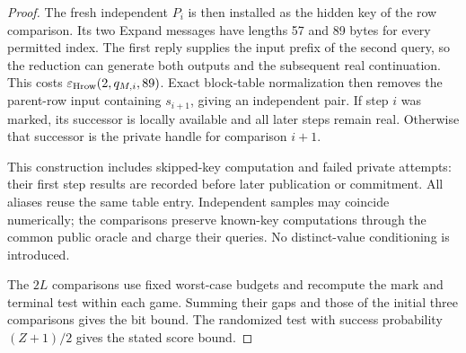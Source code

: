 \documentclass[pdflatex]{sn-jnl}
\theoremstyle{thmstyleone}
\theoremstyle{thmstylethree}
\theoremstyle{thmstyletwo}
\begin{document}
\begin{proof}
The fresh independent $P_i$ is then installed as the hidden key of
the row comparison. Its two Expand messages have lengths 57 and 89
bytes for every permitted index. The first reply supplies the input
prefix of the second query, so the reduction can generate both outputs
and the subsequent real continuation. This costs
$\varepsilon_{\rm Hrow}(2,q_{M,i},89)$. Exact block-table normalization
then removes the parent-row input containing $s_{i+1}$, giving an
independent pair. If step $i$ was marked, its successor is locally
available and all later steps remain real. Otherwise that successor
is the private handle for comparison $i+1$.

This construction includes skipped-key computation and failed private
attempts: their first step results are recorded before later publication
or commitment. All aliases reuse the same table entry. Independent
samples may coincide numerically; the comparisons preserve known-key
computations through the common public oracle and charge their queries.
No distinct-value conditioning is introduced.

The $2L$ comparisons use fixed worst-case budgets and recompute the
mark and terminal test within each game. Summing their gaps and those of
the initial three comparisons gives the bit bound.
The randomized test with success probability $(Z+1)/2$ gives the
stated score bound.
\end{proof}
\end{document}
